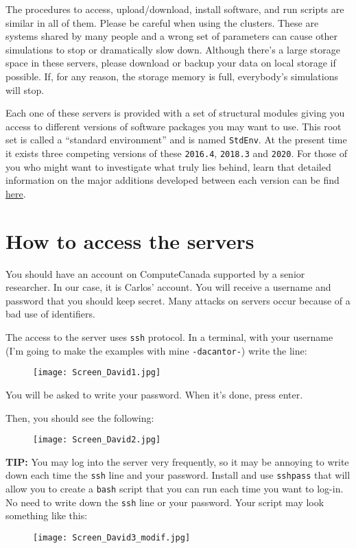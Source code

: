 \documentclass[12pt]{article}
\begin{document}
The procedures to access, upload/download, install software, and run scripts are similar in all of them. Please be careful when using the clusters. These are systems shared by many people and a wrong set of parameters can cause other simulations to stop or dramatically slow down. Although there’s a large storage space in these servers, please download or backup your data on local storage if possible. If, for any reason, the storage memory is full, everybody’s simulations will stop.

Each one of these servers is provided with a set of structural modules giving you access to different versions of software packages you may want to use. This root set is called a “standard environment” and is named \texttt{StdEnv}. At the present time it exists three competing versions of these \texttt{2016.4}, \texttt{2018.3} and \texttt{2020}. For those of you who might want to investigate what truly lies behind, learn that detailed information on the major additions developed between each version can be find \href{https://docs.computecanada.ca/wiki/Standard_software_environments}{\underline{here}}.


\section*{How to access the servers}
You should have an account on ComputeCanada supported by a senior researcher. In our case, it is Carlos’ account. You will receive a username and password that you should keep secret. Many attacks on servers occur because of a bad use of identifiers. 

The access to the server uses \texttt{ssh} protocol. In a terminal, with your username (I’m going to make the examples with mine \texttt{-dacantor-}) write the line:

\begin{figure}[H]
  \centering
  \texttt{[image: Screen\_David1.jpg]}
\end{figure}

You will be asked to write your password. When it's done, press enter.

Then, you should see the following:
\begin{figure}[H]
  \centering
  \texttt{[image: Screen\_David2.jpg]}
\end{figure}

\textbf{TIP:}
You may log into the server very frequently, so it may be annoying to write down each time the \texttt{ssh} line and your password. Install and use \texttt{sshpass} that will allow you to create a \texttt{bash} script that you can run each time you want to log-in. \\ 
No need to write down the \texttt{ssh} line or your password. Your script may look something like this:
\begin{figure}[H]
  \texttt{[image: Screen\_David3\_modif.jpg]}
\end{figure}
\end{document}
